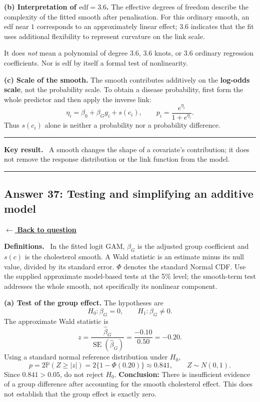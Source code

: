 \documentclass[11pt,a4paper]{article}
\newcommand{\answernav}[1]{%
  \label{answer:#1}%
  \noindent\hyperref[question:#1]{$\leftarrow$ \textbf{Back to question}}%
  \par\smallskip}
\newcommand{\studyheading}[1]{%
  \par\medskip\noindent\textcolor{statblue}{\textbf{#1.}}\ }
\newenvironment{keyresult}
  {\begin{center}\begin{minipage}{0.92\linewidth}\color{statblue}%
   \hrule\vspace{6pt}\textbf{Key result.}\ }
  {\vspace{6pt}\hrule\end{minipage}\end{center}}
\begin{document}
\textbf{(b) Interpretation of $\mathrm{edf}=3.6$.}
The effective degrees of freedom describe the complexity of the fitted
smooth after penalisation. For this ordinary smooth, an edf near $1$
corresponds to an approximately linear effect; $3.6$ indicates that the
fit uses additional flexibility to represent curvature on the link scale.

It does \emph{not} mean a polynomial of degree $3.6$, $3.6$ knots, or
$3.6$ ordinary regression coefficients. Nor is edf by itself a formal
test of nonlinearity.

\textbf{(c) Scale of the smooth.}
The smooth contributes additively on the \textbf{log-odds scale}, not the
probability scale. To obtain a disease probability, first form the whole
predictor and then apply the inverse link:
\[
\eta_i=\beta_0+\beta_Gg_i+s(c_i),
\qquad p_i=\frac{e^{\eta_i}}{1+e^{\eta_i}}.
\]
Thus $s(c_i)$ alone is neither a probability nor a probability difference.

\begin{keyresult}
A smooth changes the shape of a covariate's contribution; it does not
remove the response distribution or the link function from the model.
\end{keyresult}

\clearpage

\subsection{Answer 37: Testing and simplifying an additive model}
\answernav{37}

\studyheading{Definitions}
In the fitted logit GAM, $\beta_G$ is the adjusted group coefficient and $s(c)$ is the cholesterol smooth.
A Wald statistic is an estimate minus its null value, divided by its standard error.
$\Phi$ denotes the standard Normal CDF.
Use the supplied approximate model-based tests at the 5\% level; the smooth-term test addresses the whole smooth, not specifically its nonlinear component.

\textbf{(a) Test of the group effect.}
The hypotheses are
\[
H_0:\beta_G=0,
\qquad H_1:\beta_G\ne0.
\]
The approximate Wald statistic is
\[
z=\frac{\widehat\beta_G}{\operatorname{SE}(\widehat\beta_G)}
=\frac{-0.10}{0.50}=-0.20.
\]
Using a standard normal reference distribution under $H_0$,
\[
p=2\mathbb{P}(Z\ge |z|)
=2\{1-\Phi(0.20)\}\approx0.841,
\qquad Z\sim N(0,1).
\]
Since $0.841>0.05$, do not reject $H_0$.
\textbf{Conclusion:} There is insufficient evidence of a group difference
after accounting for the smooth cholesterol effect. This does not
establish that the group effect is exactly zero.
\end{document}
